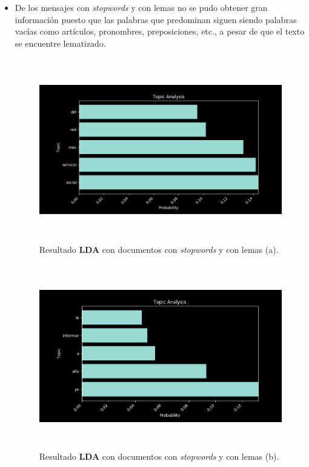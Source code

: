 \begin{itemize}
        \item De los mensajes con \textit{stopwords} y con lemas no se pudo obtener gran información puesto que las palabras que predominan siguen siendo palabras vacías como artículos, pronombres, preposiciones, etc., a pesar de que el texto se encuentre lematizado.
        \begin{figure}[H]
            \centering
            \includegraphics[height=8cm, width=16.5cm]{Latex/Classes/Imagenes/ws_wl-1.png}
            \caption{Resultado \textbf{LDA} con documentos con \textit{stopwords} y con lemas (a).}
            \label{fig:ws_wl-1}
        \end{figure}
        \begin{figure}[H]
            \centering
            \includegraphics[height=8cm, width=16.5cm]{Latex/Classes/Imagenes/ws_wl-2.png}
            \caption{Resultado \textbf{LDA} con documentos con \textit{stopwords} y con lemas (b).}
            \label{fig:ws_wl-2}
        \end{figure}
        \newpage
        

\end{itemize}
